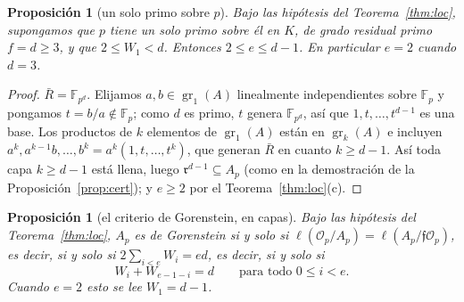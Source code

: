\documentclass[11pt,a4paper]{article}
\newtheorem{proposition}[theorem]{Proposición}
\theoremstyle{definition}
\newcommand{\FF}{\mathbb{F}}
\newcommand{\cO}{\mathcal{O}}
\newcommand{\cf}{\mathfrak{f}}
\newcommand{\rad}{\mathfrak{r}}
\newcommand{\gr}{\operatorname{gr}}
\begin{document}
\begin{proposition}[un solo primo sobre $p$]\label{prop:unprimo}
Bajo las hipótesis del Teorema~\ref{thm:loc}, supongamos que $p$ tiene un solo primo sobre él en $K$, de grado
residual primo $f=d\ge3$, y que $2\le W_1<d$. Entonces $2\le e\le d-1$. En particular $e=2$ cuando $d=3$.
\end{proposition}

\begin{proof}
$\bar R=\FF_{p^d}$. Elijamos $a,b\in\gr_1(A)$ linealmente independientes sobre $\FF_p$ y pongamos $t=b/a\notin\FF_p$;
como $d$ es primo, $t$ genera $\FF_{p^d}$, así que $1,t,\dots,t^{d-1}$ es una base. Los productos de $k$ elementos de
$\gr_1(A)$ están en $\gr_k(A)$ e incluyen $a^k,a^{k-1}b,\dots,b^k=a^k(1,t,\dots,t^k)$, que generan $\bar R$ en cuanto
$k\ge d-1$. Así toda capa $k\ge d-1$ está llena, luego $\rad^{d-1}\subseteq A_p$ (como en la demostración de la
Proposición~\ref{prop:cert}); y $e\ge2$ por el Teorema~\ref{thm:loc}(c).
\end{proof}

\begin{proposition}[el criterio de Gorenstein, en capas]\label{prop:gor}
Bajo las hipótesis del Teorema~\ref{thm:loc}, $A_p$ es de Gorenstein si y solo si $\ell(\cO_p/A_p)=\ell(A_p/\cf\cO_p)$,
es decir, si y solo si $2\sum_{i<e}W_i=ed$, es decir, si y solo si
\[
W_i+W_{e-1-i}=d\qquad\text{para todo }0\le i<e .
\]
Cuando $e=2$ esto se lee $W_1=d-1$.
\end{proposition}
\end{document}
